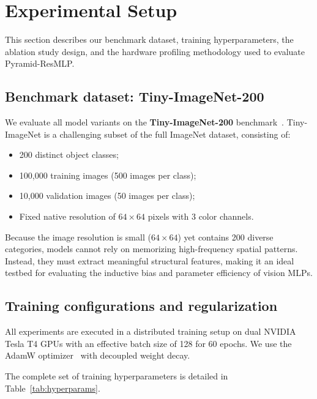\section{Experimental Setup}
\label{section:experiments}

This section describes our benchmark dataset, training hyperparameters, the ablation study design, and the hardware profiling methodology used to evaluate Pyramid-ResMLP.

\subsection{Benchmark dataset: Tiny-ImageNet-200}
\label{subsection:dataset}
We evaluate all model variants on the \textbf{Tiny-ImageNet-200} benchmark~\cite{le2015tiny}. Tiny-ImageNet is a challenging subset of the full ImageNet dataset, consisting of:
\begin{itemize}
    \item 200 distinct object classes;
    \item 100,000 training images (500 images per class);
    \item 10,000 validation images (50 images per class);
    \item Fixed native resolution of $64 \times 64$ pixels with 3 color channels.
\end{itemize}
Because the image resolution is small ($64 \times 64$) yet contains 200 diverse categories, models cannot rely on memorizing high-frequency spatial patterns. Instead, they must extract meaningful structural features, making it an ideal testbed for evaluating the inductive bias and parameter efficiency of vision MLPs.

\subsection{Training configurations and regularization}
\label{subsection:training_setup}
All experiments are executed in a distributed training setup on dual NVIDIA Tesla T4 GPUs with an effective batch size of 128 for 60 epochs. We use the AdamW optimizer~\cite{loshchilov2017adamw} with decoupled weight decay.

The complete set of training hyperparameters is detailed in Table~\ref{tab:hyperparams}.

